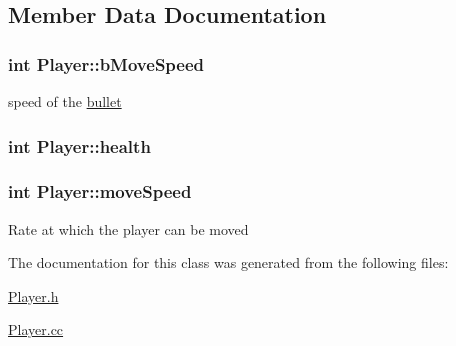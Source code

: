 \subsection{Member Data Documentation}
\hypertarget{classPlayer_a33023a67c031eceeef05268f01eae43d}{
\subsubsection[{bMoveSpeed}]{\setlength{\rightskip}{0pt plus 5cm}int {\bf Player::bMoveSpeed}}}
\label{classPlayer_a33023a67c031eceeef05268f01eae43d}
speed of the \hyperlink{classbullet}{bullet} \hypertarget{classPlayer_aad33b52bfe73c4c978a3135172f286a0}{
\subsubsection[{health}]{\setlength{\rightskip}{0pt plus 5cm}int {\bf Player::health}}}
\label{classPlayer_aad33b52bfe73c4c978a3135172f286a0}
\hypertarget{classPlayer_a84469d0950bc9151404b8930e6cf0ebb}{
\subsubsection[{moveSpeed}]{\setlength{\rightskip}{0pt plus 5cm}int {\bf Player::moveSpeed}}}
\label{classPlayer_a84469d0950bc9151404b8930e6cf0ebb}
Rate at which the player can be moved 

The documentation for this class was generated from the following files:\begin{DoxyCompactItemize}
\item 
\hyperlink{Player_8h}{Player.h}\item 
\hyperlink{Player_8cc}{Player.cc}\end{DoxyCompactItemize}
